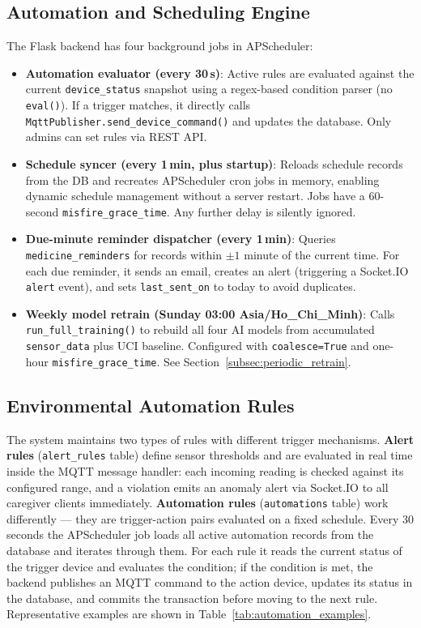 \subsection{Automation and Scheduling Engine}
The Flask backend has four background jobs in APScheduler:
\begin{itemize}
\item \textbf{Automation evaluator (every 30\,s)}: Active rules are evaluated against the current \texttt{device\_status} snapshot using a regex-based condition parser (no \texttt{eval()}). If a trigger matches, it directly calls \texttt{MqttPublisher.send\_device\_command()} and updates the database. Only admins can set rules via REST API.

\item \textbf{Schedule syncer (every 1\,min, plus startup)}: Reloads schedule records from the DB and recreates APScheduler cron jobs in memory, enabling dynamic schedule management without a server restart. Jobs have a 60-second \texttt{misfire\_grace\_time}. Any further delay is silently ignored.

\item \textbf{Due-minute reminder dispatcher (every 1\,min)}: Queries \texttt{medicine\_reminders} for records within $\pm1$ minute of the current time. For each due reminder, it sends an email, creates an alert (triggering a Socket.IO \texttt{alert} event), and sets \texttt{last\_sent\_on} to today to avoid duplicates.

\item \textbf{Weekly model retrain (Sunday 03:00 Asia/Ho\_Chi\_Minh)}: Calls \texttt{run\_full\_training()} to rebuild all four AI models from accumulated \texttt{sensor\_data} plus UCI baseline. Configured with \texttt{coalesce=True} and one-hour \texttt{misfire\_grace\_time}. See Section~\ref{subsec:periodic_retrain}.
\end{itemize}

\subsection{Environmental Automation Rules}
\label{subsec:automation_rules}

The system maintains two types of rules with different trigger mechanisms. \textbf{Alert rules} (\texttt{alert\_rules} table) define sensor thresholds and are evaluated in real time inside the MQTT message handler: each incoming reading is checked against its configured range, and a violation emits an anomaly alert via Socket.IO to all caregiver clients immediately. \textbf{Automation rules} (\texttt{automations} table) work differently --- they are trigger-action pairs evaluated on a fixed schedule. Every 30 seconds the APScheduler job loads all active automation records from the database and iterates through them. For each rule it reads the current status of the trigger device and evaluates the condition; if the condition is met, the backend publishes an MQTT command to the action device, updates its status in the database, and commits the transaction before moving to the next rule. Representative examples are shown in Table~\ref{tab:automation_examples}.

